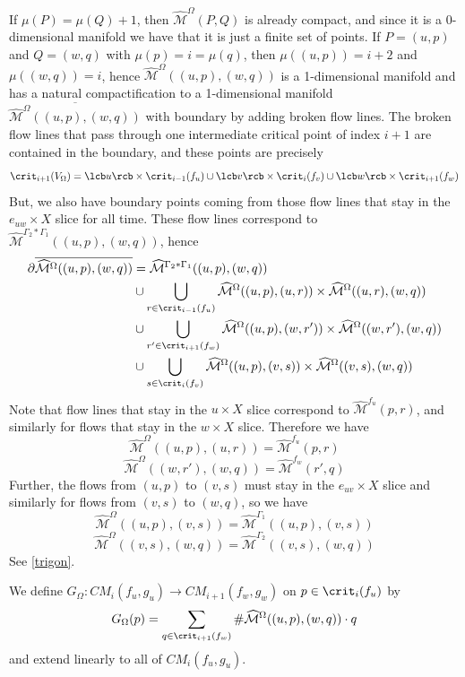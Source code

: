 If $\mu(P)=\mu(Q)+1$, then $\widehat{\mathcal M}^\Omega(P,Q)$ is already compact, and since it is a 0-dimensional manifold we have that it is just a finite set of points. If $P=(u,p)$ and $Q=(w,q)$ with $\mu(p)=i=\mu(q)$, then $\mu((u,p))=i+2$ and $\mu((w,q))=i$, hence $\widehat{\mathcal M}^\Omega((u,p),(w,q))$ is a 1-dimensional manifold and has a natural compactification to a 1-dimensional manifold $\overline{\widehat{\mathcal M}^\Omega((u,p),(w,q))}$ with boundary by adding broken flow lines. The broken flow lines that pass through one intermediate critical point of index $i+1$ are contained in the boundary, and these points are precisely
\[ \crit_{i+1}(V_\Omega) = \lcb u \rcb \times \crit_{i-1}(f_u) \cup \lcb v \rcb \times \crit_{i}(f_v) \cup \lcb w \rcb \times \crit_{i+1}(f_w) \]
But, we also have boundary points coming from those flow lines that stay in the $e_{uw} \times X$ slice for all time. These flow lines correspond to $\widehat{\mathcal M}^{\Gamma_2*\Gamma_1}((u,p),(w,q))$, hence
\begin{align*}
\partial\overline{\widehat{\mathcal M}^\Omega((u,p),(w,q))} &= \widehat{\mathcal M}^{\Gamma_2*\Gamma_1}((u,p),(w,q)) \\
  &\cup \bigcup_{r  \in \crit_{i-1}(f_u)} \widehat{\mathcal M}^\Omega((u,p),(u,r))  \times \widehat{\mathcal M}^\Omega((u,r),(w,q)) \\
  &\cup \bigcup_{r' \in \crit_{i+1}(f_w)} \widehat{\mathcal M}^\Omega((u,p),(w,r')) \times \widehat{\mathcal M}^\Omega((w,r'),(w,q)) \\
  &\cup \bigcup_{s  \in \crit_i(f_v)}     \widehat{\mathcal M}^\Omega((u,p),(v,s))  \times \widehat{\mathcal M}^\Omega((v,s),(w,q)) 
\end{align*}
Note that flow lines that stay in the $u \times X$ slice correspond to $\widehat{\mathcal M}^{f_u}(p,r)$, and similarly for flows that stay in the $w \times X$ slice. Therefore we have
\[ \widehat{\mathcal M}^\Omega((u,p),(u,r)) = \widehat{\mathcal M}^{f_u}(p,r) \]
\[ \widehat{\mathcal M}^\Omega((w,r'),(w,q)) = \widehat{\mathcal M}^{f_w}(r',q) \]
Further, the flows from $(u,p)$ to $(v,s)$ must stay in the $e_{uv} \times X$ slice and similarly for flows from $(v,s)$ to $(w,q)$, so we have
\[ \widehat{\mathcal M}^\Omega((u,p),(v,s)) = \widehat{\mathcal M}^{\Gamma_1}((u,p),(v,s)) \]
\[ \widehat{\mathcal M}^\Omega((v,s),(w,q)) = \widehat{\mathcal M}^{\Gamma_2}((v,s),(w,q)) \]
See \cref{trigon}.

We define $G_\Omega : CM_i(f_u,g_u) \rightarrow CM_{i+1}(f_w,g_w)$ on $p \in \crit_i(f_u)$ by
\[ G_\Omega(p) = \sum_{q \in \crit_{i+1}(f_w)} \# \widehat{\mathcal M}^\Omega((u,p),(w,q)) \cdot q \]
and extend linearly to all of $CM_i(f_u,g_u)$.



